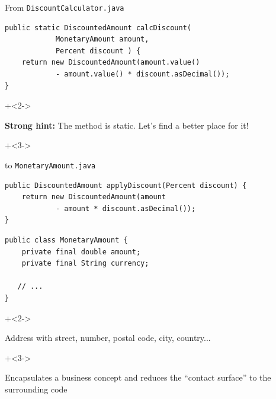 \begin{frame}[fragile]{\de{}}

From \texttt{DiscountCalculator.java}

\begin{lstlisting}
public static DiscountedAmount calcDiscount(
			MonetaryAmount amount,
			Percent discount ) {
    return new DiscountedAmount(amount.value() 
    		- amount.value() * discount.asDecimal());
}
\end{lstlisting}

\onslide+<2->
\vspace{1.5em}

\textbf{Strong hint:} The method is static. Let's find a better place for it!

\onslide+<3->
\vspace{1.5em}

to \texttt{MonetaryAmount.java}

\begin{lstlisting}
public DiscountedAmount applyDiscount(Percent discount) {
    return new DiscountedAmount(amount 
    		- amount * discount.asDecimal());
}
\end{lstlisting}


\end{frame}

\begin{frame}[fragile]{\de{}}

\begin{lstlisting}
public class MonetaryAmount {
    private final double amount;
    private final String currency;

   // ...
}
\end{lstlisting}

\onslide+<2->

\vspace{1em}
Address with street, number, postal code, city, country...

\onslide+<3->

\vspace{1em}
Encapsulates a business concept and reduces the ``contact surface'' to the surrounding code

\end{frame}


